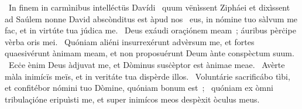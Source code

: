 {~In finem in carmìnibus intelléctüs Davídi ~quum vënìssent Zipháei et dixìssent ad Saúlem nonne David abscònditus est àpud nos}
{%
~eus, in nómine tuo sàlvum me fac, et in virtúte tua júdica me.
~Deus exáudi oraçiónem meam~; áuribus pèrċipe vèrba oris mei.
~Quóniam aliéni insurrexérunt advèrsum me, et fortes quaesivérunt ànimam meam, et non proposuérunt Deum ànte conspèctum suum.
~Ecċe ènim Deus àdjuvat me, et Dòminus susċèptor est ànimae meae.
~Avèrte màla inimícïs meïs, et in veritáte tua dispèrde illos.
~Voluntárie sacrificábo tìbi, et confitébor nómini tuo Dòmine, quóniam bonum est~;
~quóniam ex òmni tribulaçióne eripuìsti me, et super inimícos meos despèxit òculus meus.}

